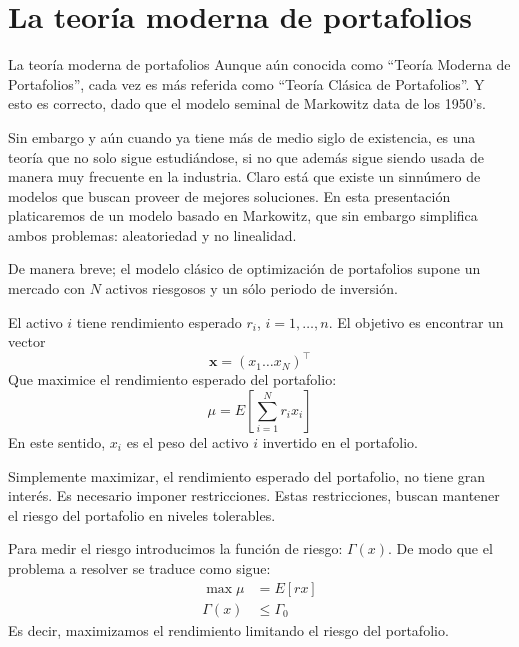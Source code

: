\documentclass{beamer}
\begin{document}
    \section[La teoría moderna de portafolios]{La teoría moderna de portafolios}
    \begin{frame}{La teoría moderna de portafolios}
        Aunque aún conocida como ``Teoría Moderna de Portafolios'', cada vez es más referida como ``Teoría Clásica de Portafolios''. Y esto es correcto, dado que el modelo seminal de Markowitz data de los 1950's. 
        \par\medskip
        Sin embargo y aún cuando ya tiene más de medio siglo de existencia, es una teoría que no solo sigue estudiándose, si no que además sigue siendo usada de manera muy frecuente en la industria.
        \medskip
        Claro está que existe un sinnúmero de modelos que buscan proveer de mejores soluciones. En esta presentación platicaremos de un modelo basado en Markowitz, que sin embargo simplifica ambos problemas: aleatoriedad y no linealidad. 
    \end{frame}
    \begin{frame}
        De manera breve; el modelo clásico de optimización de portafolios supone un mercado con $N$ activos riesgosos y un sólo periodo de inversión. 
        \par
        El activo $i$ tiene rendimiento esperado $r_i$, $i = 1, \ldots, n$. El objetivo es encontrar un vector 
        $$\mathbf{x} = (x_1\ldots x_N)^\top$$  
        Que maximice el rendimiento esperado del portafolio:
        \begin{equation}
        \mu = E\left[\sum_{i=1}^{N}r_ix_i\right]
        \label{eq:1}
        \end{equation}
        En este sentido, $x_i$ es el peso del activo $i$ invertido en el portafolio.
    \end{frame}
    \begin{frame}
        Simplemente maximizar, el rendimiento esperado del portafolio, no tiene gran interés. Es necesario imponer restricciones. Estas restricciones, buscan mantener el riesgo del portafolio en niveles tolerables. 
        \par\medskip
        Para medir el riesgo introducimos la función de riesgo: $\Gamma(x)$. De modo que el problema a resolver se traduce como sigue:
        \begin{align*}
            \max \mu&= E[rx]\\
            \Gamma(x)&\leq \Gamma_0
        \end{align*}
        Es decir, maximizamos el rendimiento limitando el riesgo del portafolio.
    \end{frame}
\end{document}
